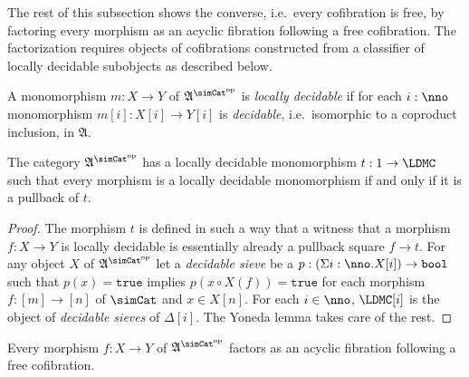 \documentclass{tac}
\newcommand\dual{^{\mathrm{op}}}
\newcommand\s{^{\simCat\dual}}
\newcommand\of{:}
\newcommand\simplex\Delta
\newcommand\true{\mathtt{true}}
\newcommand\bool{\mathtt{bool}}
\newcommand\ambient{\mathfrak A}
\begin{document}
The rest of this subsection shows the converse, i.e.\ every cofibration is free, by factoring every morphism as an acyclic fibration following a free cofibration. The factorization requires objects of cofibrations constructed from a classifier of locally decidable subobjects as described below.

\begin{definition} A monomorphism $m\of X\to Y$ of $\ambient\s$ is \emph{locally decidable} if for each $i\of\nno$ monomorphism $m[i]\of X[i]\to Y[i]$ is \emph{decidable}, i.e.\ isomorphic to a coproduct inclusion, in $\ambient$. \end{definition}

\begin{lemma} The category $\ambient\s$ has a locally decidable monomorphism $t\of 1\to \LDMC$ such that every morphism is a locally decidable monomorphism if and only if it is a pullback of $t$. \end{lemma}

\begin{proof} The morphism $t$ is defined in such a way that a witness that a morphism $f\of X\to Y$ is locally decidable is essentially already a pullback square $f\to t$. For any object $X$ of $\ambient\s$ let a \emph{decidable sieve} be a $p\of(\Sigma i\of\nno.X[i])\to\bool$ such that $p(x)=\true$ implies $p(x\circ X(f))=\true$ for each morphism $f\of [m]\to [n]$ of $\simCat$ and $x\in X[n]$. For each $i\in\nno$, $\LDMC[i]$ is the object of \emph{decidable sieves} of $\simplex[i]$. The Yoneda lemma takes care of the rest. \end{proof}

\begin{proposition} Every morphism $f\of X\to Y$ of $\ambient\s$ factors as an acyclic fibration following a free cofibration. \label{factor1} \end{proposition}
\end{document}

